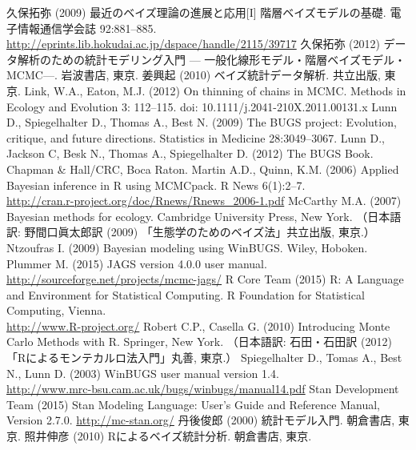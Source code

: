 \documentclass[11pt,uplatex]{jsarticle}
\begin{document}
\begin{thebibliography}{99}
 久保拓弥 (2009) 最近のベイズ理論の進展と応用[I]
  階層ベイズモデルの基礎. 電子情報通信学会誌 92:881--885.\\
  \url{http://eprints.lib.hokudai.ac.jp/dspace/handle/2115/39717}
 久保拓弥 (2012) データ解析のための統計モデリング入門 ---
   一般化線形モデル・階層ベイズモデル・MCMC---. 岩波書店, 東京.
 姜興起 (2010) ベイズ統計データ解析. 共立出版, 東京.
 Link, W.A., Eaton, M.J. (2012) On thinning of chains in MCMC.
Methods in Ecology and Evolution 3: 112--115. doi: 10.1111/j.2041-210X.2011.00131.x
 Lunn D., Spiegelhalter D., Thomas A., Best N. (2009)
  {The BUGS project: Evolution, critique, and future directions}.
  {Statistics in Medicine} {28}:3049--3067.
 Lunn D., Jackson C, Besk N., Thomas A., Spiegelhalter D.
  (2012) The {BUGS} Book. Chapman \& Hall/CRC, Boca Raton.
 Martin A.D., Quinn, K.M. (2006) Applied Bayesian inference in R
using MCMCpack. R News 6(1):2--7. \\
    \url{http://cran.r-project.org/doc/Rnews/Rnews_2006-1.pdf}
 McCarthy M.A. (2007) Bayesian methods for ecology.
  Cambridge University Press, New York.
  （日本語訳: 野間口眞太郎訳 (2009) 「生態学のためのベイズ法」共立出版, 東京.）
 Ntzoufras I. (2009) Bayesian modeling using WinBUGS.
  Wiley, Hoboken.
 Plummer M. (2015) JAGS version 4.0.0 user manual.\\
  \url{http://sourceforge.net/projects/mcmc-jags/}
 R Core Team (2015)
   R: A Language and Environment for Statistical Computing.
   R Foundation for Statistical Computing, Vienna.\\
   \url{http://www.R-project.org/}
 Robert C.P., Casella G. (2010) Introducing Monte Carlo Methods with R.
  Springer, New York.
  （日本語訳: 石田・石田訳 (2012) 「Rによるモンテカルロ法入門」丸善, 東京.）
 Spiegelhalter D., Tomas A., Best N., Lunn D. (2003)
  WinBUGS user manual version 1.4.\\
  \url{http://www.mrc-bsu.cam.ac.uk/bugs/winbugs/manual14.pdf}
 Stan Development Team (2015) Stan Modeling Language:
  User's Guide and Reference Manual, Version 2.7.0.
  \url{http://mc-stan.org/}
 丹後俊郎 (2000) 統計モデル入門. 朝倉書店, 東京.
 照井伸彦 (2010) Rによるベイズ統計分析. 朝倉書店, 東京.

\end{thebibliography}
\end{document}
